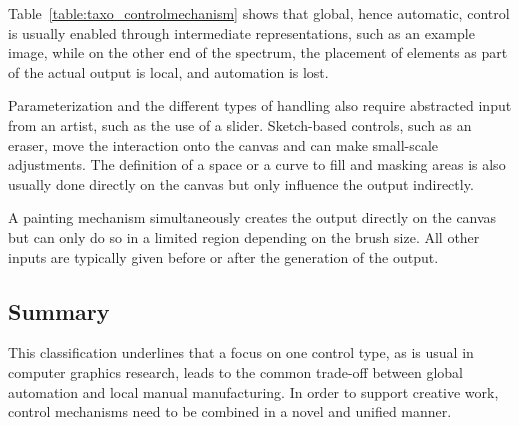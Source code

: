 
Table~\ref{table:taxo_controlmechanism} shows that global, hence automatic, control is usually enabled through intermediate representations, such as an example image, while on the other end of the spectrum, the placement of elements as part of the actual output is local, and automation is lost.

Parameterization and the different types of handling also require abstracted input from an artist, such as the use of a slider. Sketch-based controls, such as an eraser, move the interaction onto the canvas and can make small-scale adjustments. The definition of a space or a curve to fill and masking areas is also usually done directly on the canvas but only influence the output indirectly.

A painting mechanism simultaneously creates the output directly on the canvas but can only do so in a limited region depending on the brush size. All other inputs are typically given before or after the generation of the output.

\subsection{Summary}
\label{subsec:taxonomy_summary}

This classification underlines that a focus on one control type, as is usual in computer graphics research, leads to the common trade-off between global automation and local manual manufacturing. In order to support creative work, control mechanisms need to be combined in a novel and unified manner.

